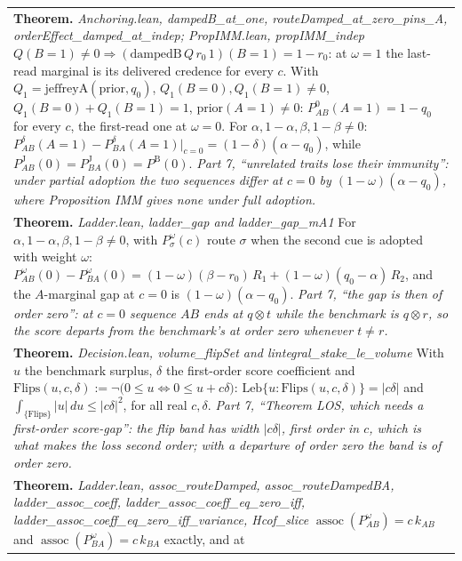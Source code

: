 \documentclass[10pt]{article}
\theoremstyle{definition}
\newcommand{\PB}{P^{\mathrm{B}}}
\newcommand{\PJ}{P^{\mathrm{J}}}
\newcommand{\assoc}{\operatorname{assoc}}
\newlength{\fullw}\setlength{\fullw}{25.9cm}
\begin{document}
{\begin{longtable}{|p{0.9cm}|p{12.2cm}|p{12.2cm}|}
\multicolumn{3}{|p{\fullw}|}{\textbf{Theorem.} \textit{Anchoring.lean, dampedB\_at\_one, routeDamped\_at\_zero\_pins\_A, orderEffect\_damped\_at\_indep; PropIMM.lean, propIMM\_indep} \newline $Q(B{=}1)\neq0\Rightarrow(\mathrm{dampedB}\,Q\,r_0\,1)(B{=}1)=1-r_0$: at $\omega=1$ the
last-read marginal is its delivered credence for every $c$. With
$Q_1=\mathrm{jeffreyA}(\mathrm{prior},q_0)$, $Q_1(B{=}0),Q_1(B{=}1)\neq0$,
$Q_1(B{=}0)+Q_1(B{=}1)=1$, $\mathrm{prior}(A{=}1)\neq0$: $P^{0}_{AB}(A{=}1)=1-q_0$ for
every $c$, the first-read one at $\omega=0$. For $\alpha,1-\alpha,\beta,1-\beta\neq0$:
$P^{\delta}_{AB}(A{=}1)-P^{\delta}_{BA}(A{=}1)\big|_{c=0}=(1-\delta)(\alpha-q_0)$, while
$\PJ_{AB}(0)=\PJ_{BA}(0)=\PB(0)$. \newline \textit{Part 7, ``unrelated traits lose their immunity'': under partial adoption the two sequences differ at $c=0$ by $(1-\omega)(\alpha-q_0)$, where Proposition IMM gives none under full adoption.}} \\
\multicolumn{3}{|p{\fullw}|}{\textbf{Theorem.} \textit{Ladder.lean, ladder\_gap and ladder\_gap\_mA1} \newline For $\alpha,1-\alpha,\beta,1-\beta\neq0$, with $P^{\omega}_{\sigma}(c)$ route $\sigma$ when the
second cue is adopted with weight $\omega$:
$P^{\omega}_{AB}(0)-P^{\omega}_{BA}(0)=(1-\omega)(\beta-r_0)\,R_1+(1-\omega)(q_0-\alpha)\,R_2$, and
the $A$-marginal gap at $c=0$ is $(1-\omega)(\alpha-q_0)$. \newline \textit{Part 7, ``the gap is then of order zero'': at $c=0$ sequence $AB$ ends at $q\otimes t$ while the benchmark is $q\otimes r$, so the score departs from the benchmark's at order zero whenever $t\neq r$.}} \\
\multicolumn{3}{|p{\fullw}|}{\textbf{Theorem.} \textit{Decision.lean, volume\_flipSet and lintegral\_stake\_le\_volume} \newline With $u$ the benchmark surplus, $\delta$ the first-order score
coefficient and $\mathrm{Flips}(u,c,\delta) := \neg\big(0\le u \iff 0\le u + c\delta\big)$:
$\mathrm{Leb}\{u : \mathrm{Flips}(u,c,\delta)\} = |c\delta|$ and
$\int_{\{\mathrm{Flips}\}} |u|\,du \le |c\delta|^2$, for all real $c,\delta$. \newline \textit{Part 7, ``Theorem LOS, which needs a first-order score-gap'': the flip band has width $|c\delta|$, first order in $c$, which is what makes the loss second order; with a departure of order zero the band is of order zero.}} \\
\multicolumn{3}{|p{\fullw}|}{\textbf{Theorem.} \textit{Ladder.lean, assoc\_routeDamped, assoc\_routeDampedBA, ladder\_assoc\_coeff, ladder\_assoc\_coeff\_eq\_zero\_iff, ladder\_assoc\_coeff\_eq\_zero\_iff\_variance, Hcof\_slice} \newline $\assoc(P^{\omega}_{AB})=c\,k_{AB}$ and $\assoc(P^{\omega}_{BA})=c\,k_{BA}$ exactly, and at
}
\end{longtable}}
\end{document}
